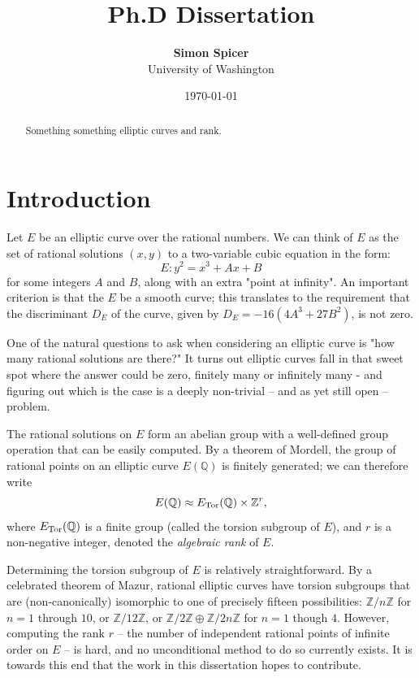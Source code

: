 \documentclass[10pt]{article}
\title{Ph.D Dissertation}
\author{{\bf Simon Spicer} \\ University of Washington}
\date{\today}
\begin{document}
\maketitle

\begin{abstract}
Something something elliptic curves and rank.
\end{abstract}

\newpage
\tableofcontents

\newpage
\section{Introduction}

Let $E$ be an elliptic curve over the rational numbers. We can think of $E$ as the set of rational solutions $(x,y)$ to a two-variable cubic equation in the form:
\begin{equation}
E: y^2 = x^3 + Ax + B
\end{equation}
for some integers $A$ and $B$, along with an extra "point at infinity". An important criterion is that the $E$ be a smooth curve; this translates to the requirement that the discriminant $D_E$ of the curve, given by $D_E = -16(4A^3+27B^2)$, is not zero.

One of the natural questions to ask when considering an elliptic curve is "how many rational solutions are there?" It turns out elliptic curves fall in that sweet spot where the answer could be zero, finitely many or infinitely many - and figuring out which is the case is a deeply non-trivial -- and as yet still open -- problem.

The rational solutions on $E$ form an abelian group with a well-defined group operation that can be easily computed. By a theorem of Mordell, the group of rational points on an elliptic curve $E(\mathbb{Q})$ is finitely generated; we can therefore write
\begin{equation}
E(\mathbb{Q}) \approx E_{\text{Tor}}(\mathbb{Q}) \times \mathbb{Z}^r,
\end{equation}
where $E_{\text{Tor}}(\mathbb{Q})$ is a finite group (called the torsion subgroup of $E$), and $r$ is a non-negative integer, denoted the {\it algebraic rank} of $E$.

Determining the torsion subgroup of $E$ is relatively straightforward. By a celebrated theorem of Mazur, rational elliptic curves have torsion subgroups that are (non-canonically) isomorphic to one of precisely fifteen possibilities: $\mathbb{Z}/n\mathbb{Z}$ for $n = 1$ through $10$, or $\mathbb{Z}/12\mathbb{Z}$, or $\mathbb{Z}/2\mathbb{Z}\oplus \mathbb{Z}/2n\mathbb{Z}$ for $n = 1$ though $4$. However, computing the rank $r$ -- the number of independent rational points of infinite order on $E$ -- is hard, and no unconditional method to do so currently exists. It is towards this end that the work in this dissertation hopes to contribute. \\
\end{document}
